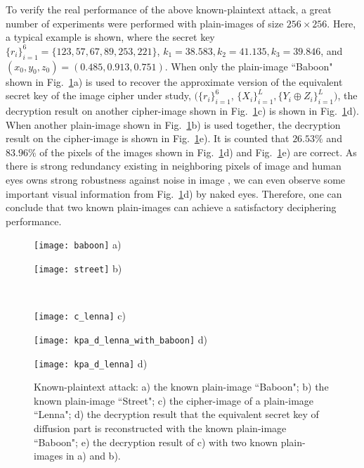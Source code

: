 \documentclass{ws-ijbc}
\newlength\twoimagewidth
\newlength\imagewidth
\begin{document}
To verify the real performance of the above known-plaintext attack,
a great number of experiments were performed with plain-images of size
$256\times 256$. Here, a typical example is shown,
where the secret key
$\{r_i\}_{i=1}^{6} = \{123, 57, 67, 89, 253, 221\}$,
$k_1 = 38.583, k_2 = 41.135, k_3 = 39.846$, and
$(x_0, y_0, z_0) = (0.485, 0.913, 0.751)$.
When only the plain-image ``Baboon" shown in Fig.~\ref{figure:kp}a)
is used to recover the approximate version of the equivalent secret key of the image cipher under study,
$(\{r_i\}_{i=1}^{6}$, $\{X_{i}\}_{i=1}^{L}, \{Y_{i}\oplus Z_{i}\}_{i=1}^{L})$, the decryption
result on another cipher-image shown in Fig.~\ref{figure:kp}c) is shown in Fig.~\ref{figure:kp}d).
When another plain-image shown in Fig.~\ref{figure:kp}b) is used together, the decryption
result on the cipher-image is shown in Fig.~\ref{figure:kp}e). It is counted that $26.53\%$ and $83.96\%$
of the pixels of the images shown in Fig.~\ref{figure:kp}d)
and Fig.~\ref{figure:kp}e) are correct.
As there is strong redundancy existing in neighboring pixels of image and human eyes owns strong robustness against noise in image \cite{Zhu:assessment:CASVT2015}, we can even observe some important visual information from Fig.~\ref{figure:kp}d) by naked eyes.
Therefore, one can conclude that two known plain-images can achieve a satisfactory deciphering performance.
\begin{figure}[!htb]
\centering
\begin{minipage}[t]{\twoimagewidth}
\centering
\texttt{[image: baboon]}
a)
\end{minipage}
\begin{minipage}[t]{\twoimagewidth}
\centering
\texttt{[image: street]}
b)
\end{minipage}
\\
\begin{minipage}[t]{\twoimagewidth}
\centering
\texttt{[image: c\_lenna]}
c)
\end{minipage}
\begin{minipage}[t]{\twoimagewidth}
\centering
\texttt{[image: kpa\_d\_lenna\_with\_baboon]}
d)
\end{minipage}
\begin{minipage}[t]{\twoimagewidth}
\centering
\texttt{[image: kpa\_d\_lenna]}
d)
\end{minipage}
\caption{Known-plaintext attack:
a) the known plain-image ``Baboon";
b) the known plain-image ``Street";
c) the cipher-image of a plain-image ``Lenna";
d) the decryption result that the equivalent secret key of diffusion part
is reconstructed with the known plain-image ``Baboon";
e) the decryption result of c) with two known plain-images in a) and b).}
\label{figure:kp}
\end{figure}
\end{document}
